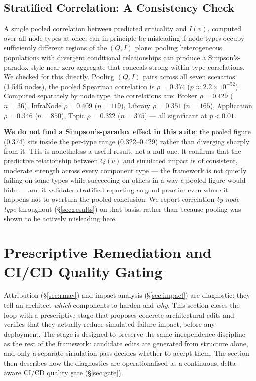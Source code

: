 \documentclass[review]{elsarticle}
\begin{document}
\subsection{Stratified Correlation: A Consistency Check}

A single pooled correlation between predicted criticality and $I(v)$, computed over all node types
at once, can in principle be misleading if node types occupy sufficiently different regions of the
$(Q, I)$ plane: pooling heterogeneous populations with divergent conditional relationships can
produce a Simpson's-paradox-style near-zero aggregate that conceals strong within-type correlations.
We checked for this directly. Pooling $(Q, I)$ pairs across all seven scenarios (1,545 nodes), the
pooled Spearman correlation is $\rho = 0.374$ ($p \approx 2.2\times10^{-52}$). Computed separately by
node type, the correlations are: Broker $\rho = 0.429$ ($n=36$), InfraNode $\rho = 0.409$ ($n=119$),
Library $\rho = 0.351$ ($n=165$), Application $\rho = 0.346$ ($n=850$), Topic $\rho = 0.322$
($n=375$) --- all significant at $p < 0.01$.

\textbf{We do not find a Simpson's-paradox effect in this suite}: the pooled figure (0.374) sits
inside the per-type range (0.322--0.429) rather than diverging sharply from it. This is nonetheless
a useful result, not a null one. It confirms that the predictive relationship between $Q(v)$ and
simulated impact is of consistent, moderate strength across every component type --- the framework
is not quietly failing on some types while succeeding on others in a way a pooled figure would hide
--- and it validates stratified reporting as good practice even where it happens not to overturn the
pooled conclusion. We report correlation \emph{by node type} throughout (\S\ref{sec:results}) on
that basis, rather than because pooling was shown to be actively misleading here.

\section{Prescriptive Remediation and CI/CD Quality Gating}
\label{sec:remediation}

Attribution (\S\ref{sec:rmav}) and impact analysis (\S\ref{sec:impact}) are diagnostic: they tell an
architect \emph{which} components to harden and \emph{why}. This section closes the loop with a
prescriptive stage that proposes concrete architectural edits and verifies that they actually reduce
simulated failure impact, before any deployment. The stage is designed to preserve the same
independence discipline as the rest of the framework: candidate edits are generated from structure
alone, and only a separate simulation pass decides whether to accept them. The section then
describes how the diagnostics are operationalised as a continuous, delta-aware CI/CD quality gate
(\S\ref{sec:gate}).
\end{document}
